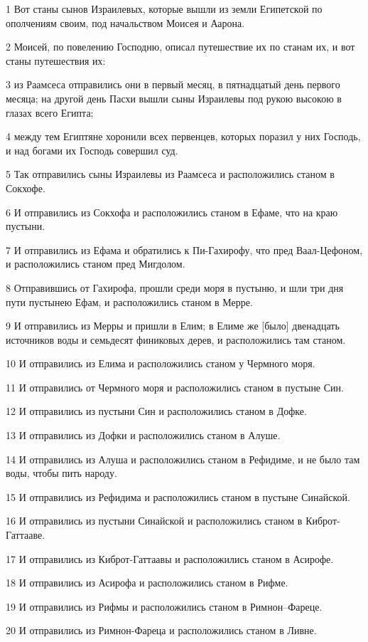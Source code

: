 \par 1 Вот станы сынов Израилевых, которые вышли из земли Египетской по ополчениям своим, под начальством Моисея и Аарона.
\par 2 Моисей, по повелению Господню, описал путешествие их по станам их, и вот станы путешествия их:
\par 3 из Раамсеса отправились они в первый месяц, в пятнадцатый день первого месяца; на другой день Пасхи вышли сыны Израилевы под рукою высокою в глазах всего Египта;
\par 4 между тем Египтяне хоронили всех первенцев, которых поразил у них Господь, и над богами их Господь совершил суд.
\par 5 Так отправились сыны Израилевы из Раамсеса и расположились станом в Сокхофе.
\par 6 И отправились из Сокхофа и расположились станом в Ефаме, что на краю пустыни.
\par 7 И отправились из Ефама и обратились к Пи-Гахирофу, что пред Ваал-Цефоном, и расположились станом пред Мигдолом.
\par 8 Отправившись от Гахирофа, прошли среди моря в пустыню, и шли три дня пути пустынею Ефам, и расположились станом в Мерре.
\par 9 И отправились из Мерры и пришли в Елим; в Елиме же [было] двенадцать источников воды и семьдесят финиковых дерев, и расположились там станом.
\par 10 И отправились из Елима и расположились станом у Чермного моря.
\par 11 И отправились от Чермного моря и расположились станом в пустыне Син.
\par 12 И отправились из пустыни Син и расположились станом в Дофке.
\par 13 И отправились из Дофки и расположились станом в Алуше.
\par 14 И отправились из Алуша и расположились станом в Рефидиме, и не было там воды, чтобы пить народу.
\par 15 И отправились из Рефидима и расположились станом в пустыне Синайской.
\par 16 И отправились из пустыни Синайской и расположились станом в Киброт-Гаттааве.
\par 17 И отправились из Киброт-Гаттаавы и расположились станом в Асирофе.
\par 18 И отправились из Асирофа и расположились станом в Рифме.
\par 19 И отправились из Рифмы и расположились станом в Римнон--Фареце.
\par 20 И отправились из Римнон-Фареца и расположились станом в Ливне.
